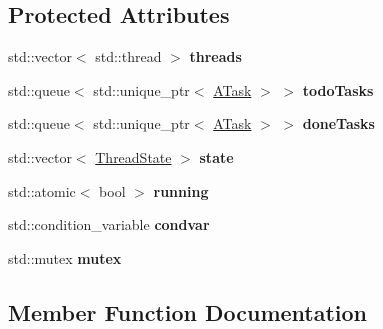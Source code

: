 \subsection*{Protected Attributes}
\begin{DoxyCompactItemize}
\item 
\mbox{\label{classxzia_1_1AThreadPool_ab73a7a7d0a1530157c318122c8a819fa}} 
std\+::vector$<$ std\+::thread $>$ {\bfseries threads}
\item 
\mbox{\label{classxzia_1_1AThreadPool_a01d8dc990cd888ded9e951c0e667d2e0}} 
std\+::queue$<$ std\+::unique\+\_\+ptr$<$ \mbox{\hyperlink{classxzia_1_1ATask}{A\+Task}} $>$ $>$ {\bfseries todo\+Tasks}
\item 
\mbox{\label{classxzia_1_1AThreadPool_ae8f8619cb333433e2f5f54f27062e55b}} 
std\+::queue$<$ std\+::unique\+\_\+ptr$<$ \mbox{\hyperlink{classxzia_1_1ATask}{A\+Task}} $>$ $>$ {\bfseries done\+Tasks}
\item 
\mbox{\label{classxzia_1_1AThreadPool_ad1c6a821ed59000b16f73216b65df2d2}} 
std\+::vector$<$ \mbox{\hyperlink{ThreadState_8hpp_a33f2462f9bd05760c2ce5ce111a5a97b}{Thread\+State}} $>$ {\bfseries state}
\item 
\mbox{\label{classxzia_1_1AThreadPool_afe629e748ba9a5e372b005a7338e1c89}} 
std\+::atomic$<$ bool $>$ {\bfseries running}
\item 
\mbox{\label{classxzia_1_1AThreadPool_ac790322a9a5b838c7c7171cd2280542a}} 
std\+::condition\+\_\+variable {\bfseries condvar}
\item 
\mbox{\label{classxzia_1_1AThreadPool_a000c60518a6828d1e74a224c0a26b2b7}} 
std\+::mutex {\bfseries mutex}
\end{DoxyCompactItemize}


\subsection{Member Function Documentation}
\mbox{\label{classxzia_1_1AThreadPool_a6c5378fecadb2043b50091f3995dc785}} 
